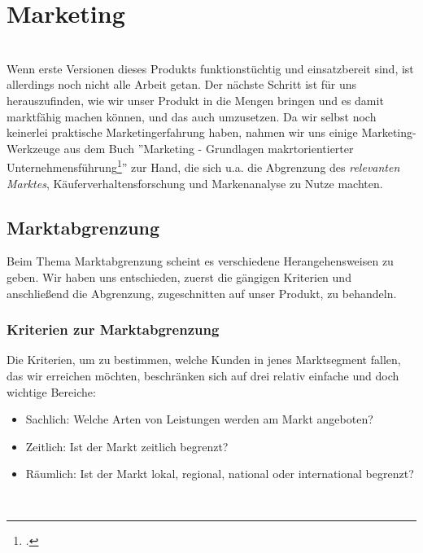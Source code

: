 \section{Marketing}\ \\
Wenn erste Versionen dieses Produkts funktionstüchtig und einsatzbereit sind, ist allerdings noch nicht alle Arbeit getan. Der nächste Schritt ist für uns herauszufinden, wie wir unser Produkt in die Mengen bringen und es damit marktfähig machen können, und das auch umzusetzen. Da wir selbst noch keinerlei praktische Marketingerfahrung haben, nahmen wir uns einige Marketing-Werkzeuge aus dem Buch ''Marketing - Grundlagen makrtorientierter Unternehmensführung\footcite{book_marketing}'' zur Hand, die sich u.a. die Abgrenzung des \textit{relevanten Marktes}, Käuferverhaltensforschung und Markenanalyse zu Nutze machten.\\

\subsection{Marktabgrenzung}
Beim Thema Marktabgrenzung scheint es verschiedene Herangehensweisen zu geben. Wir haben uns entschieden, zuerst die gängigen Kriterien und anschließend die Abgrenzung, zugeschnitten auf unser Produkt, zu behandeln.\\

\subsubsection{Kriterien zur Marktabgrenzung}
Die Kriterien, um zu bestimmen, welche Kunden in jenes Marktsegment fallen, das wir erreichen möchten, beschränken sich auf drei relativ einfache und doch wichtige Bereiche:\\

\begin{itemize}
	\item Sachlich: Welche Arten von Leistungen werden am Markt angeboten?
	\item Zeitlich: Ist der Markt zeitlich begrenzt?
	\item Räumlich: Ist der Markt lokal, regional, national oder international begrenzt?
\end{itemize}
\ \\


